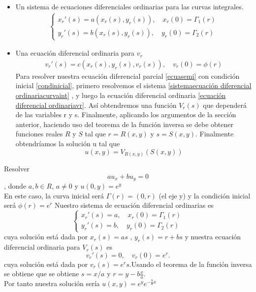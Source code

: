 \begin{itemize}
    \item Un sistema de ecuaciones diferenciales ordinarias para las curvas integrales.
    \begin{eqnarray}
        \begin{cases}
            \label{sistemaecuación diferencial ordinariacurvaint}
             x_r'(s)=a(x_r(s),y_r(s)), \quad x_r(0)=\Gamma_1(r)\\
             y_r'(s)=b(x_r(s),y_r(s)), \quad y_r(0)=\Gamma_2(r)
        \end{cases}
    \end{eqnarray}
    \item Una ecuación diferencial ordinaria para $v_r$\label{ecuación diferencial ordinariavr}
    \begin{eqnarray}
        v_r'(s)=c(x_r(s),y_r(s),v_r(s)),\quad v_r(0)=\phi(r)
    \end{eqnarray}
    Para resolver nuestra ecuación diferencial parcial \ref{ecuasemi} con condición  inicial \ref{condinicial}, primero resolvemos el sistema \ref{sistemaecuación diferencial ordinariacurvaint} , y luego la ecuación diferencial ordinaria \ref{ecuación diferencial ordinariavr}. Así obtendremos una función $V_r(s)$ que dependerá de las variables r y s.
    Finalmente, aplicando los argumentos de la sección anterior, haciendo uso del teorema de la función inversa se debe obtener funciones reales $R$ y $S$ tal que $r=R(x,y)$ y  $s=S(x,y)$.
    Finalmente obtendríamos la solución u tal que $$u(x,y)=V_{R(x,y)}(S(x,y))$$
 \end{itemize}
\begin{Ejm}
    Resolver $$au_x+bu_y=0$$, donde $a,b\in R$, $a\not=0$ y $u(0,y)=e^y$\\
    En este caso, la curva inicial será $\Gamma(r)=(0,r)$ (el eje y) y la condición inicial será $\phi(r)=e^r$
    Nuestro sistema de ecuación diferencial ordinarias es 
    $$\begin{cases}
        x_r'(s)=a, \quad x_r(0)=\Gamma_1(r)\\
        y_r'(s)=b, \quad y_r(0)=\Gamma_2(r)
    \end{cases}$$
    cuya solución está dada por $x_r(s)=as$ , $y_r(s)=r+bs$
    y nuestra ecuación diferencial ordinaria para $V_r(s)$ es
    $$ v_r'(s)=0,\quad v_r(0)=e^r.$$ cuya solución está dada por $v_r(s)=e^rs.$Usando el teorema de la función inversa se obtiene que se obtiene $s=x/a$ y $r=y-b\frac{x}{a}$.\\Por tanto nuestra solución sería $u(x,y)=e^ye^{-\frac{b}{a}x}$
\end{Ejm}